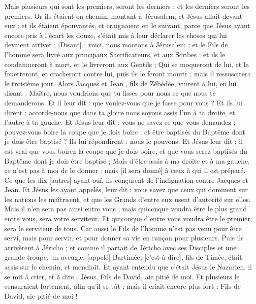 \begin{multicols}{2}
Mais plusieurs qui sont les premiers, seront les derniers ; et les derniers seront les premiers.
Or ils étaient en chemin, montant à Jérusalem, et Jésus allait devant eux ; et ils étaient épouvantés, et craignaient en le suivant, parce que Jésus ayant encore pris à l'écart les douze, s'était mis à leur déclarer les choses qui lui devaient arriver ;
[Disant] : voici, nous montons à Jérusalem ; et le Fils de l'homme sera livré aux principaux Sacrificateurs, et aux Scribes ; et ils le condamneront à mort, et le livreront aux Gentils ;
Qui se moqueront de lui, et le fouetteront, et cracheront contre lui, puis ils le feront mourir ; mais il ressuscitera le troisième jour.
Alors Jacques et Jean , fils de Zébédée, vinrent à lui, en lui disant : Maître, nous voudrions que tu fisses pour nous ce que nous te demanderons.
Et il leur dit : que voulez-vous que je fasse pour vous ?
Et ils lui dirent : accorde-nous que dans ta gloire nous soyons assis l'un à ta droite, et l'autre à ta gauche.
Et Jésus leur dit : vous ne savez ce que vous demandez ; pouvez-vous boire la coupe que je dois boire ; et être baptisés du Baptême dont je dois être baptisé ?
Ils lui répondirent : nous le pouvons. Et Jésus leur dit : il est vrai que vous boirez la coupe que je dois boire, et que vous serez baptisés du Baptême dont je dois être baptisé ;
Mais d'être assis à ma droite et à ma gauche, ce n'est pas à moi de le donner ; mais [il sera donné] à ceux à qui il est préparé.
Ce que les dix [autres] ayant ouï, ils conçurent de l'indignation contre Jacques et Jean.
Et Jésus les ayant appelés, leur dit : vous savez que ceux qui dominent sur les nations les maîtrisent, et que les Grands d'entre eux usent d'autorité sur elles.
Mais il n'en sera pas ainsi entre vous ; mais quiconque voudra être le plus grand entre vous, sera votre serviteur.
Et quiconque d'entre vous voudra être le premier, sera le serviteur de tous.
Car aussi le Fils de l'homme n'est pas venu pour être servi, mais pour servir, et pour donner sa vie en rançon pour plusieurs.
Puis ils arrivèrent à Jéricho ; et comme il partait de Jéricho avec ses Disciples et une grande troupe, un aveugle, [appelé] Bartimée, [c'est-à-dire], fils de Timée, était assis sur le chemin, et mendiait.
Et ayant entendu que c'était Jésus le Nazarien, il se mit à crier, et à dire : Jésus, Fils de David, aie pitié de moi.
Et plusieurs le censuraient fortement, afin qu'il se tût ; mais il criait encore plus fort : Fils de David, aie pitié de moi !

\end{multicols}
